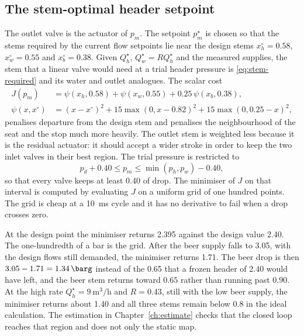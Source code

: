 \subsection{The stem-optimal header setpoint}

The outlet valve is the actuator of $p_m$. The setpoint $p_m^\star$ is chosen so that the stems required by the current flow setpoints lie near the design stems $x_h^\circ=0.58$, $x_w^\circ=0.55$ and $x_b^\circ=0.38$. Given $Q_h^\star$, $Q_w^\star = R Q_h^\star$ and the measured supplies, the stem that a linear valve would need at a trial header pressure is \eqref{eq:stem-required} and its water and outlet analogues. The scalar cost
\begin{equation}
\label{eq:cost}
\begin{aligned}
J(p_m) &= \psi(x_h,0.58) + \psi(x_w,0.55) + 0.25\,\psi(x_b,0.38),\\
\psi(x,x^\circ) &= (x-x^\circ)^2 + 15\max(0,x-0.82)^2 + 15\max(0,0.25-x)^2,
\end{aligned}
\end{equation}
penalises departure from the design stem and penalises the neighbourhood of the seat and the stop much more heavily. The outlet stem is weighted less because it is the residual actuator: it should accept a wider stroke in order to keep the two inlet valves in their best region. The trial pressure is restricted to
\begin{equation}
\label{eq:pm-bounds}
p_d + 0.40 \le p_m \le \min(p_h,p_w) - 0.40,
\end{equation}
so that every valve keeps at least \SI{0.40}{\barg} of drop. The minimiser of $J$ on that interval is computed by evaluating $J$ on a uniform grid of one hundred points. The grid is cheap at a \SI{10}{ms} cycle and it has no derivative to fail when a drop crosses zero.

At the design point the minimiser returns \SI{2.395}{\barg} against the design value \SI{2.40}{\barg}. The one-hundredth of a bar is the grid. After the beer supply falls to \SI{3.05}{\barg}, with the design flows still demanded, the minimiser returns \SI{1.71}{\barg}. The beer drop is then $3.05-1.71=\SI{1.34}{\barg}$ instead of the \SI{0.65}{\barg} that a frozen header of \SI{2.40}{\barg} would have left, and the beer stem returns toward $0.65$ rather than running past $0.90$. At the high rate $Q_h^\star=\SI{9}{\cubic\metre\per\hour}$ and $R=0.43$, still with the low beer supply, the minimiser returns about \SI{1.40}{\barg} and all three stems remain below $0.8$ in the ideal calculation. The estimation in Chapter~\ref{ch:estimate} checks that the closed loop reaches that region and does not only the static map.

